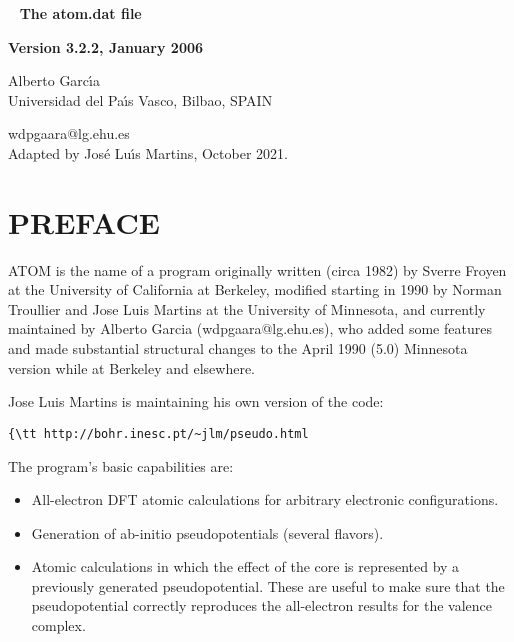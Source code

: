 \documentclass[11pt]{article}
\begin{document}

\begin{titlepage}

\begin{center}
~
\vfill
\vspace{1cm}
{\Huge {\bf The atom.dat file}}
\par\vspace{3cm}
\hrulefill
\par\vspace{3cm}
{\Large {\bf Version 3.2.2, January 2006}}
\par\vspace{2cm}
\hrulefill

{\Large Alberto Garc\'{\i}a \\
 Universidad del Pa\'{\i}s Vasco, Bilbao, SPAIN 

  wdpgaara@lg.ehu.es\\
  
Adapted by Jos\'e Lu\'{\i}s Martins, October 2021.
  }
\vfill
\end{center}

\end{titlepage}

\tableofcontents
\newpage

\section{PREFACE}

{\sc ATOM} is the name of a program originally written (circa 1982) by
Sverre Froyen at the University of California at Berkeley, modified
starting in 1990 by Norman Troullier and Jose Luis Martins at the
University of Minnesota, and currently maintained by Alberto Garcia
(wdpgaara@lg.ehu.es), who added some features and made substantial
structural changes to the April 1990 (5.0) Minnesota version while at
Berkeley and elsewhere.

Jose Luis Martins is maintaining his own version of the code:
\begin{verbatim}{\tt http://bohr.inesc.pt/~jlm/pseudo.html\end{verbatim}


The program's basic capabilities are:

\begin{itemize}
\item All-electron DFT atomic calculations for arbitrary electronic
configurations.

\item Generation of ab-initio pseudopotentials (several flavors).

\item Atomic calculations in which the effect of the core is represented
by a previously generated pseudopotential. These are useful to make
sure that the pseudopotential correctly reproduces the all-electron
results for the valence complex.

\end{itemize}
\end{document}
